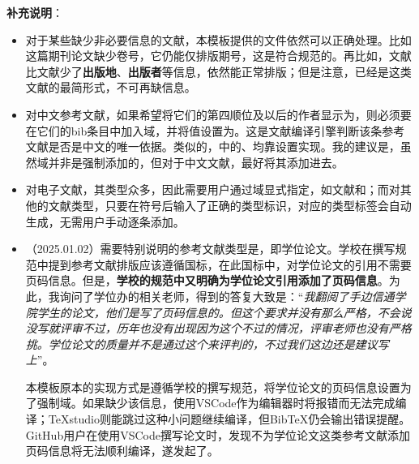 \documentclass[doctor, vlined]{DissertUESTC}
\begin{document}
	\textbf{补充说明}：
	\begin{itemize}
		\item 对于某些缺少非必要信息的文献，本模板提供的文件依然可以正确处理。比如\cite{王晓琰2019关于连续出版会议论文著录格式的探讨}这篇期刊论文缺少卷号，它仍能仅排版期号，这是符合规范的。再比如，文献\cite{电子文献2}比文献\cite{电子文献1}少了\textbf{出版地}、\textbf{出版者}等信息，依然能正常排版；但是注意，\cite{电子文献2}已经是这类文献的最简形式，不可再缺信息。
		
		\item 对中文参考文献，如果希望将它们的第四顺位及以后的作者显示为，则必须要在它们的bib条目中加入域，并将值设置为。这是文献编译引擎判断该条参考文献是否是中文的唯一依据。类似的，\cite{罗杰斯2011}中的、均靠设置实现。我的建议是，虽然域并非是强制添加的，但对于中文文献，最好将其添加进去。
		
		\item 对电子文献，其类型众多，因此需要用户通过域显式指定，如文献\cite{电子文献1}和\cite{电子文献2}；而对其他的文献类型，只要在符号后输入了正确的类型标识，对应的类型标签会自动生成，无需用户手动逐条添加。
		
		\item （2025.01.02）需要特别说明的参考文献类型是，即学位论文。学校在撰写规范中提到参考文献排版应该遵循国标\href{https://lib.tsinghua.edu.cn/wj/GBT7714-2015.pdf}{\color{DarkRed}}，在此国标中，对学位论文的引用不需要页码信息。但是，\textbf{学校的规范中又明确为学位论文引用添加了页码信息}。为此，我询问了学位办的相关老师，得到的答复大致是：“\textit{我翻阅了手边信通学院学生的论文，他们是写了页码信息的。但这个要求并没有那么严格，不会说没写就评审不过，历年也没有出现因为这个不过的情况，评审老师也没有严格挑。学位论文的质量并不是通过这个来评判的，不过我们这边还是建议写上}”。
   
		本模板原本的实现方式是遵循学校的撰写规范，将学位论文的页码信息设置为了强制域。如果缺少该信息，使用VSCode作为编辑器时将报错而无法完成编译；TeXstudio则能跳过这种小问题继续编译，但BibTeX仍会输出错误提醒。GitHub用户\href{https://github.com/zealrussell}{\color{DarkRed}}在使用VSCode撰写论文时，发现不为学位论文这类参考文献添加页码信息将无法顺利编译，遂发起了\href{https://github.com/MGG1996/DissertationUESTC/issues/7}{\color{DarkRed}}。
		

\end{itemize}
\end{document}

